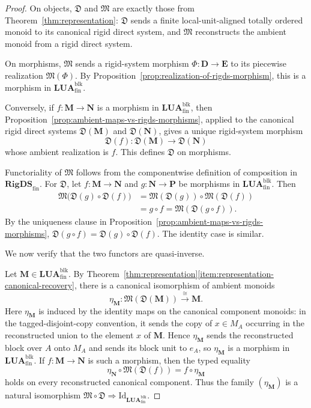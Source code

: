 \documentclass[pdflatex,sn-mathphys-num]{sn-jnl}
\theoremstyle{thmstyleone}%
\theoremstyle{thmstyletwo}%
\theoremstyle{thmstylethree}%
\begin{document}
\begin{proof}
On objects, \(\mathfrak D\) and \(\mathfrak M\) are exactly those from Theorem~\ref{thm:representation}: \(\mathfrak D\) sends a finite local-unit-aligned totally ordered monoid to its canonical rigid direct system, and \(\mathfrak M\) reconstructs the ambient monoid from a rigid direct system.

On morphisms, \(\mathfrak M\) sends a rigid-system morphism \(\Phi\colon\mathbf D\to\mathbf E\) to its piecewise realization \(\mathfrak M(\Phi)\).
By Proposition~\ref{prop:realization-of-rigds-morphism}, this is a morphism in \(\mathbf{LUA}^{\mathrm{blk}}_{\mathrm{fin}}\).

Conversely, if \(f\colon \mathbf M\to \mathbf N\) is a morphism in \(\mathbf{LUA}^{\mathrm{blk}}_{\mathrm{fin}}\), then Proposition~\ref{prop:ambient-maps-vs-rigds-morphisms}, applied to the canonical rigid direct systems \(\mathfrak D(\mathbf M)\) and \(\mathfrak D(\mathbf N)\), gives a unique rigid-system morphism
\[
\mathfrak D(f)\colon \mathfrak D(\mathbf M)\to \mathfrak D(\mathbf N)
\]
whose ambient realization is \(f\).
This defines \(\mathfrak D\) on morphisms.

Functoriality of \(\mathfrak M\) follows from the componentwise definition of composition in \(\mathbf{RigDS}_{\mathrm{fin}}\).
For \(\mathfrak D\), let \(f\colon \mathbf M\to \mathbf N\) and \(g\colon \mathbf N\to \mathbf P\) be morphisms in \(\mathbf{LUA}^{\mathrm{blk}}_{\mathrm{fin}}\).
Then
\begin{align*}
\mathfrak M\bigl(\mathfrak D(g)\circ \mathfrak D(f)\bigr)
&=\mathfrak M(\mathfrak D(g))\circ \mathfrak M(\mathfrak D(f))\\
&=g\circ f
 =\mathfrak M(\mathfrak D(g\circ f)).
\end{align*}
By the uniqueness clause in Proposition~\ref{prop:ambient-maps-vs-rigds-morphisms}, \(\mathfrak D(g\circ f)=\mathfrak D(g)\circ \mathfrak D(f)\).
The identity case is similar.

We now verify that the two functors are quasi-inverse.

Let \(\mathbf M\in \mathbf{LUA}^{\mathrm{blk}}_{\mathrm{fin}}\).
By Theorem~\ref{thm:representation}\ref{item:representation-canonical-recovery}, there is a canonical isomorphism of ambient monoids
\[
\eta_{\mathbf M}\colon \mathfrak M(\mathfrak D(\mathbf M))
\xrightarrow{\ \cong\ } \mathbf M.
\]
Here \(\eta_{\mathbf M}\) is induced by the identity maps on the canonical component monoids: in the tagged-disjoint-copy convention, it sends the copy of \(x\in M_A\) occurring in the reconstructed union to the element \(x\) of \(\mathbf M\).
Hence \(\eta_{\mathbf M}\) sends the reconstructed block over \(A\) onto \(M_A\) and sends its block unit to \(e_A\), so \(\eta_{\mathbf M}\) is a morphism in \(\mathbf{LUA}^{\mathrm{blk}}_{\mathrm{fin}}\).
If \(f\colon \mathbf M\to \mathbf N\) is such a morphism, then the typed equality
\[
\eta_{\mathbf N}\circ \mathfrak M(\mathfrak D(f))
=f\circ \eta_{\mathbf M}
\]
holds on every reconstructed canonical component.
Thus the family \((\eta_{\mathbf M})\) is a natural isomorphism \(\mathfrak M\circ \mathfrak D\Rightarrow \mathrm{Id}_{\mathbf{LUA}^{\mathrm{blk}}_{\mathrm{fin}}}\).


\end{proof}
\end{document}
